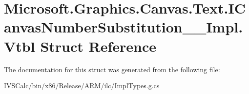 \hypertarget{struct_microsoft_1_1_graphics_1_1_canvas_1_1_text_1_1_i_canvas_number_substitution_____impl_1_1_vtbl}{}\section{Microsoft.\+Graphics.\+Canvas.\+Text.\+I\+Canvas\+Number\+Substitution\+\_\+\+\_\+\+Impl.\+Vtbl Struct Reference}
\label{struct_microsoft_1_1_graphics_1_1_canvas_1_1_text_1_1_i_canvas_number_substitution_____impl_1_1_vtbl}


The documentation for this struct was generated from the following file\+:\begin{DoxyCompactItemize}
\item 
I\+V\+S\+Calc/bin/x86/\+Release/\+A\+R\+M/ilc/Impl\+Types.\+g.\+cs\end{DoxyCompactItemize}
